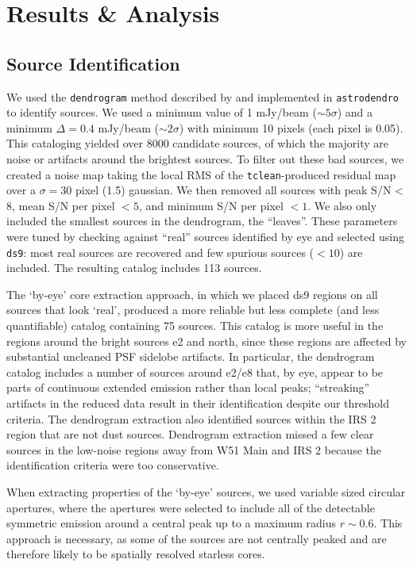 \documentclass{aa}
\begin{document}
\section{Results \& Analysis}
\label{sec:results}
\subsection{Source Identification}
\label{sec:sourceid}
We used the \texttt{dendrogram} method described by \citet{Rosolowsky2008c} and
implemented in \texttt{astrodendro} to identify sources.  We used a minimum
value of 1 mJy/beam ($\sim5\sigma$) and a minimum $\Delta=0.4$ mJy/beam
($\sim2\sigma$) with minimum 10 pixels (each pixel is 0.05\arcsec).  This
cataloging yielded over 8000 candidate sources, of which the majority are noise
or artifacts around the brightest sources.  To filter out these bad sources,
we created a noise map taking the local RMS of the \texttt{tclean}-produced
residual map over a $\sigma=30$ pixel (1.5\arcsec) gaussian.  We then removed
all sources with peak S/N < 8, mean S/N per pixel $< 5$, and minimum S/N per
pixel $ < 1$.  We also only included the smallest sources in the dendrogram,
the ``leaves''.  These parameters were tuned by checking against ``real''
sources identified by eye and selected using \texttt{ds9}: most real sources are
recovered and few spurious sources ($<10$) are
included.  The resulting catalog includes 113 sources.

The `by-eye' core extraction approach, in which we placed ds9 regions on all
sources that look `real', produced a more reliable but less complete (and less
quantifiable) catalog containing 75 sources.  This catalog is more useful in
the regions around the bright sources e2 and north, since these regions are
affected by substantial uncleaned PSF sidelobe artifacts.  In particular, the
dendrogram catalog includes a number of sources around e2/e8 that, by eye,
appear to be parts of continuous extended emission rather than local peaks;
``streaking'' artifacts in the reduced data result in their identification
despite our threshold criteria.  The dendrogram extraction also identified
sources within the IRS 2 \hii region that are not dust sources.  Dendrogram
extraction missed a few clear sources in the low-noise regions away from
W51 Main and IRS 2 because the identification criteria were too conservative.

When extracting properties of the `by-eye' sources, we used variable sized
circular apertures, where the apertures were selected to include all of the
detectable symmetric emission around a central peak up to a maximum radius
$r\sim0.6$\arcsec.  This approach is necessary, as some of the sources are not
centrally peaked and are therefore likely to be spatially resolved starless
cores.
\end{document}
